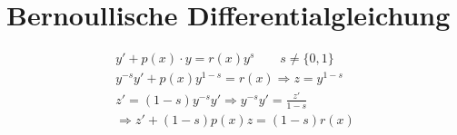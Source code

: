 \section{Bernoullische Differentialgleichung}

\begin{align*}
y'+p(x)\cdot y = r(x)y^{s}\qquad s\neq\{0,1\}\\
y^{-s}y' + p(x)y^{1-s} = r(x)\Rightarrow z=y^{1-s}\\
z'=(1-s)y^{-s}y'\Rightarrow y^{-s}y'=\frac{z'}{1-s}\\
\Longrightarrow \boxed{z'+(1-s)p(x)z= (1-s)r(x)}
\end{align*}